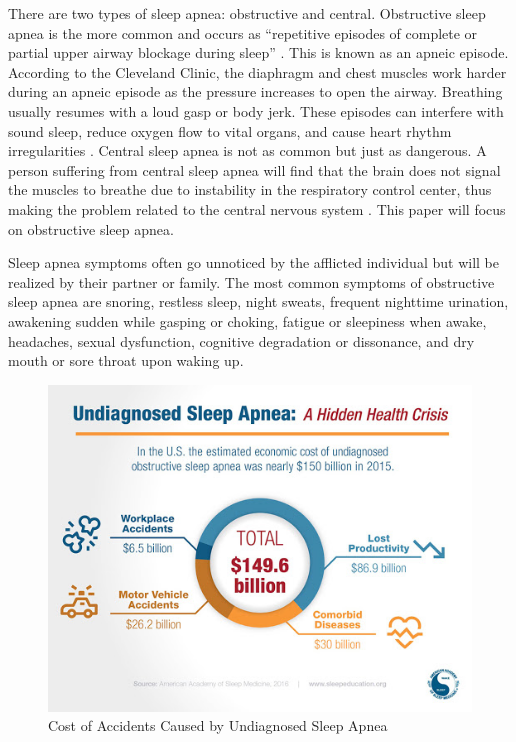 \documentclass[10pt,conference,a4paper]{IEEEtran}
\begin{document}
There are two types of sleep apnea: obstructive and central. Obstructive sleep apnea is the more common and occurs as “repetitive episodes of complete or partial upper airway blockage during sleep” \cite{clevelandClinic}. This is known as an apneic episode. According to the Cleveland Clinic, the diaphragm and chest muscles work harder during an apneic episode as the pressure increases to open the airway. Breathing usually resumes with a loud gasp or body jerk. These episodes can interfere with sound sleep, reduce oxygen flow to vital organs, and cause heart rhythm irregularities \cite{clevelandClinic}. Central sleep apnea is not as common but just as dangerous. A person suffering from central sleep apnea will find that the brain does not signal the muscles to breathe due to instability in the respiratory control center, thus making the problem related to the central nervous system \cite{clevelandClinic}. This paper will focus on obstructive sleep apnea. 

Sleep apnea symptoms often go unnoticed by the afflicted individual but will be realized by their partner or family. The most common symptoms of obstructive sleep apnea are snoring, restless sleep, night sweats, frequent nighttime urination, awakening sudden while gasping or choking, fatigue or sleepiness when awake, headaches, sexual dysfunction, cognitive degradation or dissonance, and dry mouth or sore throat upon waking up\cite{clevelandClinic}. 

\begin{figure}[h]
    \centering
    \includegraphics[width=0.9\columnwidth]{apneacost.jpg}
    \caption{Cost of Accidents Caused by Undiagnosed Sleep Apnea\cite{ecomApnea}}
    \label{fig:apneaCost}
\end{figure}
\end{document}
